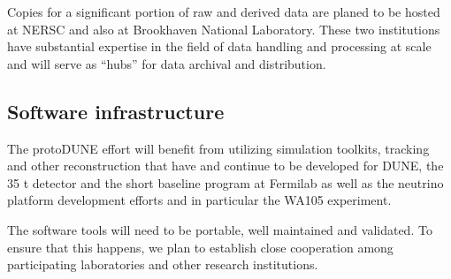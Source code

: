 Copies for a significant portion of raw and derived data are planed to be hosted at NERSC and also at Brookhaven National Laboratory.
These two institutions have substantial expertise  in the field of data handling and processing at scale and will serve as ``hubs'' for data archival and distribution.


\subsection{Software infrastructure}

The protoDUNE effort will benefit from utilizing simulation toolkits, tracking and other reconstruction
that have and continue to be developed for DUNE, the 35 t detector and the short baseline program at Fermilab as well as the 
neutrino platform development efforts and in particular the WA105 experiment.

The software tools will need to be portable, well maintained and validated. To ensure that this happens,
we plan to establish close cooperation among participating laboratories and other research institutions.



